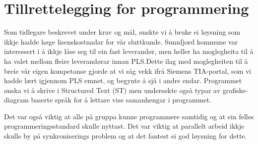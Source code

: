 \chapter{Tillrettelegging for programmering}
\thispagestyle{fancy}
\label{sec:5} 

Som tidlegare beskrevet under krav og mål, ønskte vi å bruke ei løysning som ikkje hadde høge lisenskostnadar for vår sluttkunde. 
Sunnfjord kommune var interessert i å ikkje låse seg til ein fast leverandør, men heller ha moglegheita til å ha valet mellom fleire 
leverandørar innan PLS.\@ Dette ilag med moglegheiten til å breie vår eigen kompetanse 
gjorde at vi såg vekk ifrå Siemens TIA-portal, som vi hadde lært igjennom PLS emnet, 
og begynte å sjå i andre endar.
Programmet ønska vi å skrive i Structured Text (ST) men undersøkte også 
typar av grafiske-diagram baserte språk for å lettare vise samanhengar i programmet.

Det var også viktig at alle på gruppa kunne programmere samtidig og at ein felles programmeringsstandard skulle nyttast.
Det var viktig at parallelt arbeid ikkje skulle by på synkroniserings problem og at det fantest ei god løysning for dette.

